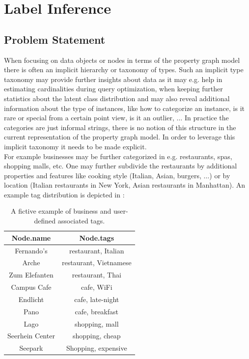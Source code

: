 \chapter{Label Inference}\label{\positionnumber}
\section{Problem Statement}\label{\positionnumber}
When focusing on data objects or nodes in terms of the property graph model there is often an implicit hierarchy or taxonomy of types. Such an implicit type taxonomy may provide further insights about data as it may e.g. help in estimating cardinalities during query optimization, when keeping further statistics about the latent class distribution and may also reveal additional information about the type of instances, like how to categorize an instance, is it rare or special from a certain point view, is it an outlier, $\ldots$ In practice the categories are just informal strings, there is no notion of this structure in the current representation of the property graph model. In order to leverage this implicit taxonomy it needs to be made explicit. \\

\noindent For example businesses may be further categorized in e.g. restaurants, spas, shopping malls, etc. One may further subdivide the restaurants by additional properties and features like cooking style (Italian, Asian, burgers, $\ldots$) or by location (Italian restaurants in New York, Asian restaurants in Manhattan).
An example tag distribution is depicted in : \\
\begin{table}[htp]
     \centering
     \begin{tabular}{c c} \toprule
            Node.name & Node.tags \\ \midrule
            Fernando's & restaurant, Italian \\ 
            Arche & restaurant, Vietnamese \\ 
            Zum Elefanten & restaurant, Thai \\ 
            Campus Cafe & cafe, WiFi \\ 
            Endlicht & cafe, late-night \\ 
            Pano & cafe, breakfast \\
            Lago & shopping, mall \\ 
            Seerhein Center & shopping, cheap \\ 
            Seepark & Shopping, expensive \\ \bottomrule
        \end{tabular}
    \caption{A fictive example of business and user-defined associated tags.}
    \label{tab:running_ex}
\end{table}{}

